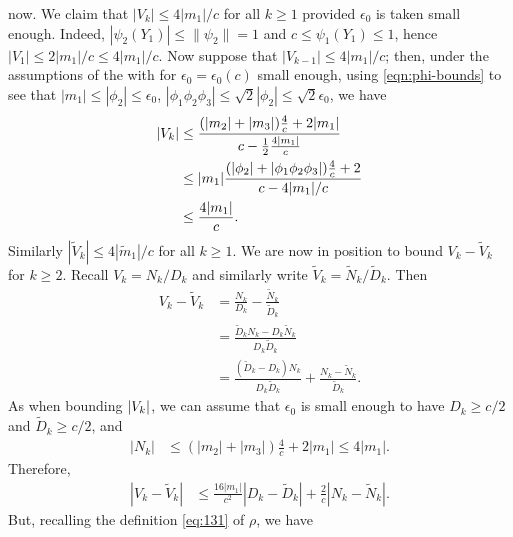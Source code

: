 \documentclass[journal]{IEEEtran}
\newcommand{\1}{\boldsymbol{1}}
\DeclarePairedDelimiter{\abs}{\lvert}{\rvert}
\begin{document}
  now. We claim that $|V_k| \leq 4|m_1|/c$ for all $k\geq 1$ provided $\epsilon_0$ is taken small enough. Indeed,
  $|\psi_2(Y_1)| \leq \|\psi_2\| = 1$ and $c\leq \psi_1(Y_1) \leq 1$, hence
  $|V_1| \leq 2 |m_1|/c \leq 4|m_1|/c$. Now suppose that
  $|V_{k-1}| \leq 4|m_1|/c$; then, under the assumptions of the  with for $\epsilon_0=\epsilon_0(c)$ small enough, using \cref{eqn:phi-bounds} to see that $|m_1| \leq |\phi_2| \leq \epsilon_0$, $|\phi_1 \phi_2 \phi_3| \leq \sqrt{2}|\phi_2| \leq \sqrt{2}\epsilon_0$, we have
  \begin{align}
	\notag
	|V_k|%
	&\leq \frac{(|m_2| + |m_3|)\frac{4}{c} + 2|m_1|}{c - \frac{1}{2}\frac{4|m_1|}{c} }\\
	\notag
	&\leq |m_1| \frac{(|\phi_2| + |\phi_1\phi_2\phi_3|)\frac{4}{c} + 2 }{c - 4 |m_1|/c}\\
	\label{eq:kl:57}
	&\leq \frac{4|m_1|}{c}.
  \end{align}
  Similarly $|\tilde{V}_k| \leq 4 |\tilde{m}_1|/c$ for all $k \geq 1$. We are
  now in position to bound $V_k - \tilde{V}_k$ for $k\geq 2$. Recall
  $V_k = N_k/D_k$ and similarly write $\tilde{V}_k = \tilde{N}_k/\tilde{D}_k$. Then
  \begin{align*}
	V_k - \tilde{V}_k%
	&= \frac{N_k}{D_k} - \frac{\tilde{N}_k}{\tilde{D}_k}\\%
	&= \frac{\tilde{D}_kN_k - D_k \tilde{N}_k}{D_k\tilde{D}_k}\\%
	&= \frac{(\tilde{D}_k - D_k)N_k}{D_k\tilde{D}_k}%
	+ \frac{N_k - \tilde{N}_k}{\tilde{D}_k}.
  \end{align*}
  As when bounding $\abs{V_k}$, we can assume that $\epsilon_0$ is small enough to have $D_k \geq c/2$ and $\tilde{D}_k \geq c/2$, and
  \begin{align*}
	|N_k|%
	&\leq (|m_2| + |m_3|)\frac{4}{c} + 2|m_1|%
	\leq 4|m_1|.
  \end{align*}
  Therefore,
  \begin{align}
	\label{eq:kl:59}
	|V_k - \tilde{V}_k|%
	&\leq \frac{16|m_1|}{c^2}|D_k - \tilde{D}_k|%
   + \frac{2}{c}|N_k - \tilde{N}_k|.
  \end{align}
  But, recalling the definition \eqref{eq:131} of $\rho$, we have
\end{document}
